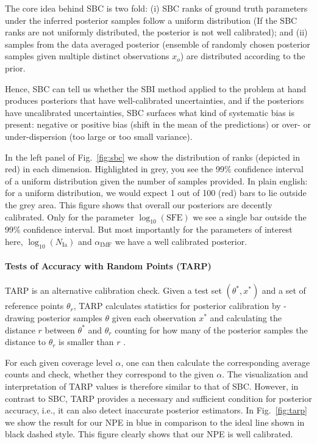 \documentclass{aa}
\begin{document}
\begin{appendix}
The core idea behind SBC is two fold: (i) SBC ranks of ground truth parameters under the inferred posterior samples follow a uniform distribution (If the SBC ranks are not uniformly distributed, the posterior is not well calibrated); and (ii) samples from the data averaged posterior (ensemble of randomly chosen posterior samples given multiple distinct observations $x_o$) are distributed according to the prior.

Hence, SBC can tell us whether the SBI method applied to the problem at hand produces posteriors that have well-calibrated uncertainties, and if the posteriors have uncalibrated uncertainties, SBC surfaces what kind of systematic bias is present: negative or positive bias (shift in the mean of the predictions) or over- or under-dispersion (too large or too small variance).

In the left panel of Fig.~\ref{fig:sbc} we show the distribution of ranks (depicted in red) in each dimension. Highlighted in grey, you see the 99\% confidence interval of a uniform distribution given the number of samples provided. In plain english: for a uniform distribution, we would expect 1 out of 100 (red) bars to lie outside the grey area. This figure shows that overall our posteriors are decently calibrated. Only for the parameter $\log_{10}\left(\mathrm{SFE}\right)$ we see a single bar outside the 99\% confidence interval. But most importantly for the parameters of interest here, $\log_{10}\left(N_\mathrm{Ia}\right)$ and $\alpha_\mathrm{IMF}$ we have a well calibrated posterior.

\paragraph{Tests of Accuracy with Random Points (TARP)}

TARP \citep{Lemos2023} is an alternative calibration check. Given a test set $(\theta^*,x^*)$ and a set of reference points $\theta_r$, TARP calculates statistics for posterior calibration by - drawing posterior samples $\theta$ given each observation $x^*$ and calculating the distance $r$ between $\theta^*$ and $\theta_r$ counting for how many of the posterior samples the distance to $\theta_r$ is smaller than $r$ \citep[see e.g. Fig.~2 in][for an illustration]{Lemos2023}.

For each given coverage level $\alpha$, one can then calculate the corresponding average counts and check, whether they correspond to the given $\alpha$. The visualization and interpretation of TARP values is therefore similar to that of SBC. However, in contrast to SBC, TARP provides a necessary and sufficient condition for posterior accuracy, i.e., it can also detect inaccurate posterior estimators. In Fig.~\ref{fig:tarp} we show the result for our NPE in blue in comparison to the ideal line shown in black dashed style. This figure clearly shows that our NPE is well calibrated.


\end{appendix}
\end{document}
